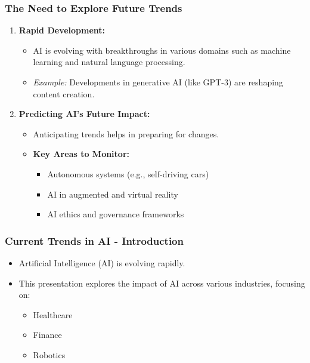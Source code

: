 \documentclass[aspectratio=169]{beamer}
\begin{document}
\begin{frame}[fragile]
    \frametitle{The Need to Explore Future Trends}
    \begin{enumerate}
        \item \textbf{Rapid Development:} 
        \begin{itemize}
            \item AI is evolving with breakthroughs in various domains such as machine learning and natural language processing.
            \item \textit{Example:} Developments in generative AI (like GPT-3) are reshaping content creation.
        \end{itemize}
        
        \item \textbf{Predicting AI’s Future Impact:}
        \begin{itemize}
            \item Anticipating trends helps in preparing for changes.
            \item \textbf{Key Areas to Monitor:}
            \begin{itemize}
                \item Autonomous systems (e.g., self-driving cars)
                \item AI in augmented and virtual reality
                \item AI ethics and governance frameworks
            \end{itemize}
        \end{itemize}
    \end{enumerate}
\end{frame}

\begin{frame}[fragile]
    \frametitle{Current Trends in AI - Introduction}
    \begin{itemize}
        \item Artificial Intelligence (AI) is evolving rapidly.
        \item This presentation explores the impact of AI across various industries, focusing on:
        \begin{itemize}
            \item Healthcare
            \item Finance
            \item Robotics
        \end{itemize}
    \end{itemize}
\end{frame}
\end{document}

